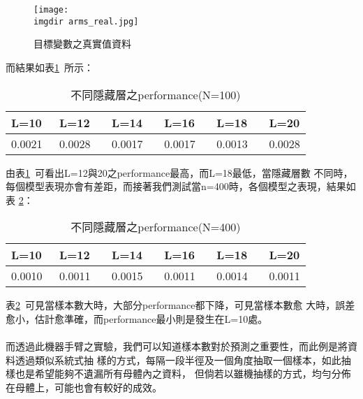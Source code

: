        \begin{figure}[H]	
			\centering	 			 	 
   			\texttt{[image: \\imgdir arms\_real.jpg]} 
   			\caption{目標變數之真實值資料}
   			\label{fig:arms_real}   			 		 
		\end{figure}				
        
        而結果如表\ref{table:armsResult}\ 所示：
        \begin{table}[h]				
			\caption{不同隱藏層之performance(N=100)}\label{table:armsResult}
			\centering
			\extrarowheight=8pt
			\begin{tabular}{llllll} 					
				\hline
				L=10\ &L=12 \ &L=14 \ &L=16 \ &L=18 \ &L=20\\ \hline	
				0.0021\ & 0.0028\ & 0.0017\ & 0.0017\ & 0.0013\ & 0.0028\\ \hline	
			\end{tabular}
		\end{table}
		由表\ref{table:armsResult}\ 可看出L=12與20之performance最高，而L=18最低，當隱藏層數			不同時，每個模型表現亦會有差距，而接著我們測試當n=400時，各個模型之表現，結果如表					\ref{table:armsResult2}：
		\begin{table}[H]				
			\caption{不同隱藏層之performance(N=400)}\label{table:armsResult2}
			\centering
			\extrarowheight=8pt
			\begin{tabular}{llllll} 					
				\hline
				L=10\ &L=12 \ &L=14 \ &L=16 \ &L=18 \ &L=20\\ \hline	
				0.0010\ & 0.0011\ & 0.0015\ & 0.0011\ & 0.0014\ & 0.0011\\ \hline	
			\end{tabular}
		\end{table}
		表\ref{table:armsResult2}\ 可見當樣本數大時，大部分performance都下降，可見當樣本數愈			大時，誤差愈小，估計愈準確，而performance最小則是發生在L=10處。
		\\
		\\
		而透過此機器手臂之實驗，我們可以知道樣本數對於預測之重要性，而此例是將資料透過類似系統式抽			樣的方式，每隔一段半徑及一個角度抽取一個樣本，如此抽樣也是希望能夠不遺漏所有母體內之資料，			但倘若以雖機抽樣的方式，均勻分佈在母體上，可能也會有較好的成效。
        
